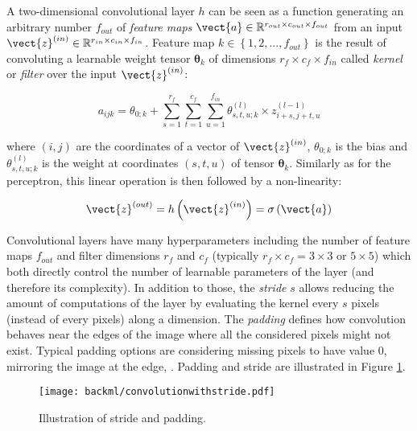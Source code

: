 A two-dimensional convolutional layer $h$ can be seen as a function generating an
arbitrary number $f_{out}$ of \textit{feature maps}
$\vect{a} \in \mathbb{R}^{r_{out} \times c_{out} \times f_{out}}$ from an input
$\vect{z}^{(in)} \in \mathbb{R}^{r_{in} \times c_{in} \times f_{in}}$. Feature
map $k \in \left\{1, 2, ..., f_{out}\right\}$ is the result of convoluting a
learnable weight tensor $\pmb{\theta}_k$ of dimensions $r_f \times c_f \times f_{in}$
called \textit{kernel} or \textit{filter} over the input $\vect{z}^{(in)}$:

\begin{equation}
\label{eqn:backml:convnet}
a_{ijk} = \theta_{0;k} + \sum_{s=1}^{r_f} \sum_{t=1}^{c_f} \sum_{u=1}^{f_{in}} \theta^{(l)}_{s,t,u;k} \times z^{(l-1)}_{i+s,j+t,u}
\end{equation}

where $(i, j)$ are the coordinates of a vector of $\vect{z}^{(in)}$, $\theta_{0;k}$
is the bias and $\theta^{(l)}_{s,t,u;k}$ is the weight at coordinates $(s,t,u)$
of tensor $\pmb{\theta}_k$. Similarly as for the perceptron, this linear operation
is then followed by a non-linearity:

\begin{equation}
\label{eqn:backml:convnetwithactiv}
\vect{z}^{(out)} = h\left(\vect{z}^{(in)}\right) = \sigma\left(\vect{a}\right)
\end{equation}

Convolutional layers have many hyperparameters including the number of feature
maps $f_{out}$ and filter dimensions $r_f$ and $c_f$ (typically $r_f \times c_f = 3 \times 3$
or $5 \times 5$) which both directly control the number of learnable parameters
of the layer (and therefore its complexity). In addition to those, the \textit{stride}
$s$ allows reducing the amount of computations of the layer by evaluating the
kernel every $s$ pixels (instead of every pixels) along a dimension. The
\textit{padding} defines how convolution behaves near the edges of the image where
all the considered pixels might not exist. Typical padding options are considering
missing pixels to have value 0, mirroring the image at the edge, \etc. Padding
and stride are illustrated in Figure \ref{fig:backml:paddingstride}.

\begin{figure}
  \centering
  \texttt{[image: backml/convolutionwithstride.pdf]}
  \caption{Illustration of stride and padding.}
  \label{fig:backml:paddingstride}
\end{figure}

